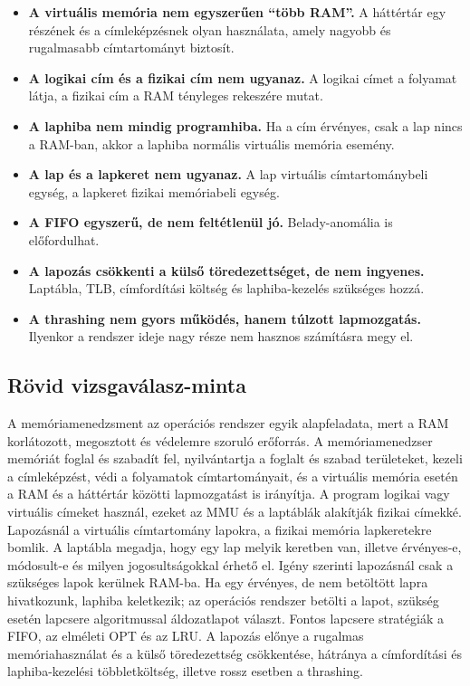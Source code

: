 \begin{itemize}
  \item \textbf{A virtuális memória nem egyszerűen ``több RAM''.} A háttértár egy részének és a címleképzésnek olyan használata, amely nagyobb és rugalmasabb címtartományt biztosít.
  \item \textbf{A logikai cím és a fizikai cím nem ugyanaz.} A logikai címet a folyamat látja, a fizikai cím a RAM tényleges rekeszére mutat.
  \item \textbf{A laphiba nem mindig programhiba.} Ha a cím érvényes, csak a lap nincs a RAM-ban, akkor a laphiba normális virtuális memória esemény.
  \item \textbf{A lap és a lapkeret nem ugyanaz.} A lap virtuális címtartománybeli egység, a lapkeret fizikai memóriabeli egység.
  \item \textbf{A FIFO egyszerű, de nem feltétlenül jó.} Belady-anomália is előfordulhat.
  \item \textbf{A lapozás csökkenti a külső töredezettséget, de nem ingyenes.} Laptábla, TLB, címfordítási költség és laphiba-kezelés szükséges hozzá.
  \item \textbf{A thrashing nem gyors működés, hanem túlzott lapmozgatás.} Ilyenkor a rendszer ideje nagy része nem hasznos számításra megy el.
\end{itemize}

\subsection{Rövid vizsgaválasz-minta}

\begin{summarybox}
A memóriamenedzsment az operációs rendszer egyik alapfeladata, mert a RAM korlátozott, megosztott és védelemre szoruló erőforrás. A memóriamenedzser memóriát foglal és szabadít fel, nyilvántartja a foglalt és szabad területeket, kezeli a címleképzést, védi a folyamatok címtartományait, és a virtuális memória esetén a RAM és a háttértár közötti lapmozgatást is irányítja. A program logikai vagy virtuális címeket használ, ezeket az MMU és a laptáblák alakítják fizikai címekké. Lapozásnál a virtuális címtartomány lapokra, a fizikai memória lapkeretekre bomlik. A laptábla megadja, hogy egy lap melyik keretben van, illetve érvényes-e, módosult-e és milyen jogosultságokkal érhető el. Igény szerinti lapozásnál csak a szükséges lapok kerülnek RAM-ba. Ha egy érvényes, de nem betöltött lapra hivatkozunk, laphiba keletkezik; az operációs rendszer betölti a lapot, szükség esetén lapcsere algoritmussal áldozatlapot választ. Fontos lapcsere stratégiák a FIFO, az elméleti OPT és az LRU. A lapozás előnye a rugalmas memóriahasználat és a külső töredezettség csökkentése, hátránya a címfordítási és laphiba-kezelési többletköltség, illetve rossz esetben a thrashing.
\end{summarybox}
